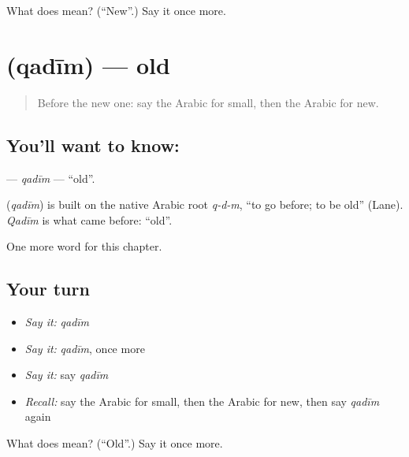 \begin{tcolorbox}[breakable,colback=teal!4,colframe=teal!35!black,title={Before you move on}]
What does  mean? (\textquotedblleft{}New\textquotedblright{}.) Say it once more.
\end{tcolorbox}
\section[\texorpdfstring{\ar{قديم} (qadīm)}{قديم (qadīm)}]{ (qadīm) — old}

\label{lesson:AR-C82-qadim}



\begin{quote}
Before the new one: say the Arabic for small, then the Arabic for new.
\end{quote}

\subsection*{You'll want to know: }
\textbf{} — \emph{qadīm} — \textquotedblleft{}old\textquotedblright{}.

\begin{cousinweb}
\textbf{} (\emph{qadīm}) is built on the native Arabic root \emph{q-d-m}, \textquotedblleft{}to go before; to be old\textquotedblright{} (Lane). \emph{Qadīm} is what came before: \textquotedblleft{}old\textquotedblright{}.
\end{cousinweb}

\begin{grammarlens}[title={What you've built}]
One more word for this chapter.
\end{grammarlens}

\subsection*{Your turn}
\begin{itemize}
\raggedright
  \item \emph{Say it:} \emph{qadīm}
  \item \emph{Say it:} \emph{qadīm}, once more
  \item \emph{Say it:} say \emph{qadīm}
  \item \emph{Recall:} say the Arabic for small, then the Arabic for new, then say \emph{qadīm} again
\end{itemize}

\begin{tcolorbox}[breakable,colback=teal!4,colframe=teal!35!black,title={Before you move on}]
What does  mean? (\textquotedblleft{}Old\textquotedblright{}.) Say it once more.
\end{tcolorbox}
